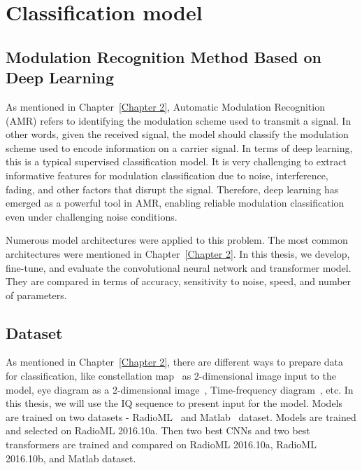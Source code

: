 

\chapter{Classification model} \label{Chapter 4}

\section{Modulation Recognition Method Based on\\ Deep Learning}

As mentioned in Chapter~\ref{Chapter 2}, Automatic Modulation Recognition (AMR) refers to identifying the modulation scheme used to transmit a signal. In other words, given the received signal, the model should classify the modulation scheme used to encode information on a carrier signal. In terms of deep learning, this is a typical supervised classification model. It is very challenging to extract informative features for modulation classification due to noise, interference, fading, and other factors that disrupt the signal. Therefore, deep learning has emerged as a powerful tool in AMR, enabling reliable modulation classification even under challenging noise conditions. 

Numerous model architectures were applied to this problem. The most common architectures were mentioned in Chapter~\ref{Chapter 2}. In this thesis, we develop, fine-tune, and evaluate the convolutional neural network and transformer model. They are compared in terms of accuracy, sensitivity to noise, speed, and number of parameters. 

\section{Dataset}

As mentioned in Chapter~\ref{Chapter 2}, there are different ways to prepare data for classification, like constellation map~\cite{vgg_simc} as 2-dimensional image input to the model, eye diagram as a 2-dimensional image~\cite{eye_diagram_simc}, Time-frequency diagram~\cite{time_freq_diagram_simc}, etc. In this thesis, we will use the IQ sequence to present input for the model. Models are trained on two datasets - RadioML~\cite{cnn_dnn_simc} and Matlab~\cite{matlab_model} dataset. Models are trained and selected on RadioML 2016.10a. Then two best CNNs and two best transformers are trained and compared on RadioML 2016.10a, RadioML 2016.10b, and Matlab dataset.

